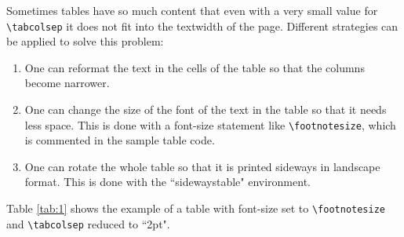 \documentclass[a4paper,twoside]{article}
\begin{document}
Sometimes tables have so much content that even with a very small value for \verb|\tabcolsep| it does not fit into the textwidth of the page. Different strategies can be applied to solve this problem:
\begin{enumerate}
  \item One can reformat the text in the cells of the table so that the columns become narrower.
  \item One can change the size of the font of the text in the table so that it needs less space. This is done with a font-size statement like \verb|\footnotesize|, which is commented in the sample table code.
  \item One can rotate the whole table so that it is printed sideways in landscape format. This is done with the ``sidewaystable" environment.
\end{enumerate}

Table \ref{tab:1} shows the example of a table with font-size set to \verb|\footnotesize| and \verb|\tabcolsep| reduced to ``2pt".
\end{document}
